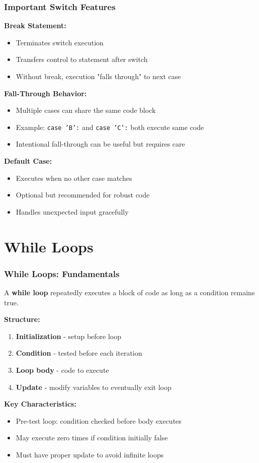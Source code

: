 \documentclass{beamer}
\begin{document}
\begin{frame}
\frametitle{Important Switch Features}
\textbf{Break Statement:}
\begin{itemize}
\item Terminates switch execution
\pause
\item Transfers control to statement after switch
\pause
\item Without break, execution "falls through" to next case
\end{itemize}

\textbf{Fall-Through Behavior:}
\begin{itemize}
\item Multiple cases can share the same code block
\pause
\item Example: \texttt{case 'B':} and \texttt{case 'C':} both execute same code
\pause
\item Intentional fall-through can be useful but requires care
\end{itemize}

\textbf{Default Case:}
\begin{itemize}
\item Executes when no other case matches
\pause
\item Optional but recommended for robust code
\pause
\item Handles unexpected input gracefully
\end{itemize}
\end{frame}

\section{While Loops}

\begin{frame}
\frametitle{While Loops: Fundamentals}
A \textbf{while loop} repeatedly executes a block of code as long as a condition remains true.

\textbf{Structure:}
\begin{enumerate}
\item \textbf{Initialization} - setup before loop
\pause
\item \textbf{Condition} - tested before each iteration
\pause
\item \textbf{Loop body} - code to execute
\pause
\item \textbf{Update} - modify variables to eventually exit loop
\end{enumerate}

\textbf{Key Characteristics:}
\begin{itemize}
\item Pre-test loop: condition checked before body executes
\pause
\item May execute zero times if condition initially false
\pause
\item Must have proper update to avoid infinite loops
\end{itemize}
\end{frame}
\end{document}
